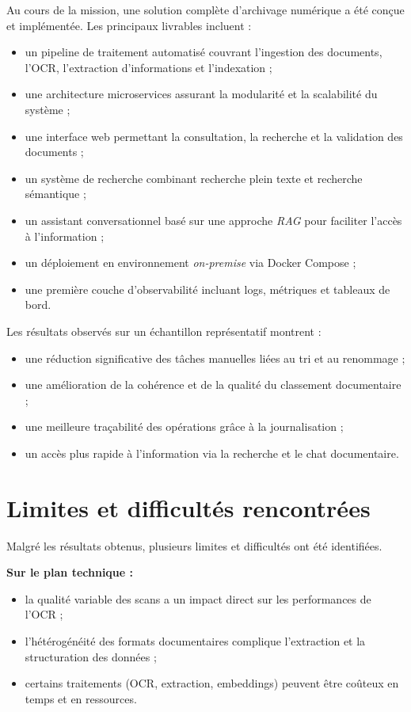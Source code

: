 \documentclass[12pt,a4paper]{report}
\begin{document}
Au cours de la mission, une solution complète d’archivage numérique a été conçue et implémentée. Les principaux livrables incluent :
\begin{itemize}
  \item un pipeline de traitement automatisé couvrant l’ingestion des documents, l’OCR, l’extraction d’informations et l’indexation ;
  \item une architecture microservices assurant la modularité et la scalabilité du système ;
  \item une interface web permettant la consultation, la recherche et la validation des documents ;
  \item un système de recherche combinant recherche plein texte et recherche sémantique ;
  \item un assistant conversationnel basé sur une approche \textit{RAG} pour faciliter l’accès à l’information ;
  \item un déploiement en environnement \textit{on-premise} via Docker Compose ;
  \item une première couche d’observabilité incluant logs, métriques et tableaux de bord.
\end{itemize}

Les résultats observés sur un échantillon représentatif montrent :
\begin{itemize}
  \item une réduction significative des tâches manuelles liées au tri et au renommage ;
  \item une amélioration de la cohérence et de la qualité du classement documentaire ;
  \item une meilleure traçabilité des opérations grâce à la journalisation ;
  \item un accès plus rapide à l’information via la recherche et le chat documentaire.
\end{itemize}

\section{Limites et difficultés rencontrées}
Malgré les résultats obtenus, plusieurs limites et difficultés ont été identifiées.

\textbf{Sur le plan technique :}
\begin{itemize}
  \item la qualité variable des scans a un impact direct sur les performances de l’OCR ;
  \item l’hétérogénéité des formats documentaires complique l’extraction et la structuration des données ;
  \item certains traitements (OCR, extraction, embeddings) peuvent être coûteux en temps et en ressources.
\end{itemize}
\end{document}
